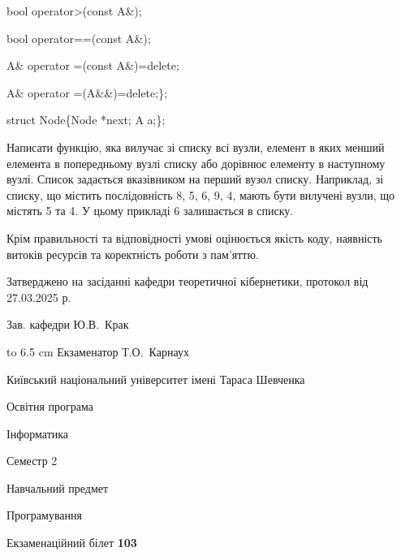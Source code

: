 \documentclass[12pt, ukrainian]{article}
\begin{document}
{\quad  bool operator>(const A\&); 

\quad  bool operator==(const A\&); 

\quad A\& operator =(const A\&)=delete; 

\quad  A\& operator =(A\&\&)=delete;\};

struct Node\{Node *next; A a;\};

 Написати функцію, яка вилучає зі списку всі вузли, елемент в яких менший елемента в попередньому вузлі списку або дорівнює елементу в наступному вузлі. Список задається вказівником на перший вузол списку. Наприклад, зі списку, що містить послідовність 8, 5, 6, 9, 4, мають бути вилучені вузли, що містять 5 та 4. У цьому прикладі 6 залишається в списку.

Крім правильності та відповідності умові оцінюється якість коду, наявність витоків ресурсів та коректність роботи з пам'яттю. 

}
{\smallskip\smallskip \begin {scriptsize} Затверджено на засіданні кафедри теоретичної кібернетики, протокол   від   27.03.2025 р.\par\smallskip\smallskip\smallskip\smallskip
{\parbox {6.5 cm} {Зав. кафедри \dotfill Ю.В.~Крак}}\hspace {0.7cm} {\hbox to 6.5 cm { Екзаменатор \dotfill Т.О.~Карнаух}} \end{scriptsize}}
\newpage
{{\begin {scriptsize}\par
{ \center  Київський національний університет імені Тараса Шевченка \par}
{\parbox {5 cm}{Освітня програма \hfill}{\parbox {7 cm}{Інформатика\hfill}}\parbox {6 cm}{\hfill Семестр 2}}\par
{\parbox {5 cm} {Навчальний предмет \hfill}\parbox {7 cm}{Програмування \hfill}\parbox {6cm}{\hfill}\par}\vspace{-15pt} \end{scriptsize}}{\center Екзаменаційний білет \No \textbf { 103 }\par}}
\end{document}
